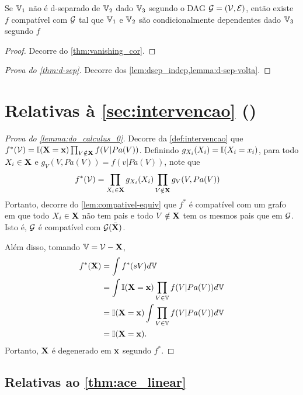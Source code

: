 \begin{lemma}
 \label{lemma:d-sep-volta}
 Se ${\mathbb V}_1$ não é d-separado de ${\mathbb V}_2$
 dado ${\mathbb V}_3$ segundo o DAG ${\mathcal G} = ({\mathcal V}, {\mathcal E})$, então
 existe $f$ compatível com ${\mathcal G}$ tal que
 ${\mathbb V}_1$ e ${\mathbb V}_2$ são condicionalmente dependentes
 dado ${\mathbb V}_3$ segundo $f$
\end{lemma}

\begin{proof}
 Decorre do \cref{thm:vanishing_cor}.
\end{proof}

\begin{proof}[Prova do \cref{thm:d-sep}]
 Decorre dos 
 \cref{lem:dsep_indep,lemma:d-sep-volta}.
\end{proof}

\section{Relativas à \cref{sec:intervencao} ()}

\begin{proof}[Prova do \cref{lemma:do_calculus_0}]
 Decorre da \cref{def:intervencao} que
 $f^*({\mathcal V}) = {\mathbb I}({\mathbf{X}}={\mathbf{x}}) \prod_{V \notin {\mathbf{X}}}f(V|Pa(V))$.
 Definindo $g_{X_i}(X_i) = {\mathbb I}(X_i=x_i)$, para todo $X_i \in {\mathbf{X}}$ e
 $g_V(V,Pa(V)) = f(v|Pa(V))$, note que
 \begin{align*}
  f^*({\mathcal V})
  &= \prod_{X_i \in {\mathbf{X}}}g_{X_i}(X_i)
  \prod_{V \notin {\mathbf{X}}}g_V(V,Pa(V)) 
 \end{align*}
 Portanto, decorre do \cref{lem:compativel-equiv} que
 $f^*$ é compatível com um grafo em que
 todo $X_i \in {\mathbf{X}}$ não tem pais e
 todo $V \notin {\mathbf{X}}$ tem os mesmos pais que em ${\mathcal G}$.
 Isto é, ${\mathcal G}$ é compatível com ${\mathcal G}(\bar{{\mathbf{X}}})$.
 
 Além disso, tomando ${\mathbb V} = {\mathcal V} - {\mathbf{X}}$,
 \begin{align*}
  f^*({\mathbf{X}})
  &= \int f^*(sV) d{\mathbb V} \\
  &= \int {\mathbb I}({\mathbf{X}}={\mathbf{x}}) \prod_{V \in {\mathbb V}}f(V|Pa(V)) d{\mathbb V} \\
  &= {\mathbb I}({\mathbf{X}}={\mathbf{x}}) \int \prod_{V \in {\mathbb V}}f(V|Pa(V)) d{\mathbb V} \\
  &= {\mathbb I}({\mathbf{X}}={\mathbf{x}}).
 \end{align*}
 Portanto, ${\mathbf{X}}$ é degenerado em ${\mathbf{x}}$ segundo $f^*$.
\end{proof}

\subsection{Relativas ao \cref{thm:ace_linear}}

